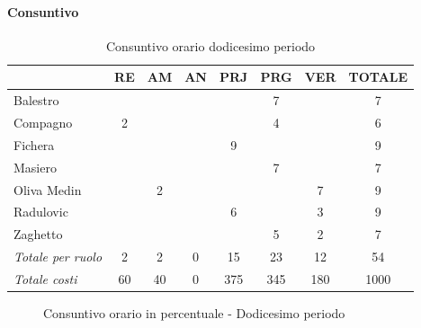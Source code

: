 \documentclass[a4paper,12pt]{article}
\begin{document}
            \paragraph{Consuntivo}
                \begin{table}[H]
                \centering
                \caption{Consuntivo orario dodicesimo periodo}
                \begin{tabular}{|l|c|c|c|c|c|c|c|}
                \hline
                    \rowcolor{lightgray}{\textbf{Membro}} & {\textbf{RE}} & {\textbf{AM}} & {\textbf{AN}} & {\textbf{PRJ}} & {\textbf{PRG}} & {\textbf{VER}} & {\textbf{TOTALE}}\\
                \hline
                    Balestro & & & & & 7 & & 7\\
                \hline
                    Compagno & 2 & & & & 4 & & 6\\
                \hline
                    Fichera & & & & 9 & & & 9\\
                \hline
                    Masiero & & & & & 7 & & 7\\
                \hline
                    Oliva Medin & & 2 & & & & 7 & 9\\
                \hline
                    Radulovic & & & & 6 & & 3 & 9\\
                \hline
                    Zaghetto & & & & & 5 & 2 & 7\\
                \hline
                    \rowcolor{lightgray}\textit{Totale per ruolo} & 2 & 2 & 0 & 15 & 23 & 12 & 54\\
                \hline
                    \rowcolor{lightgray}\textit{Totale costi} & 60 & 40 & 0 & 375 & 345 & 180 & 1000\\
                \hline
                \end{tabular}
                \end{table}

                \begin{figure}[H]
                \centering
                \caption{Consuntivo orario in percentuale - Dodicesimo periodo}
                \end{figure}
                
\end{document}
